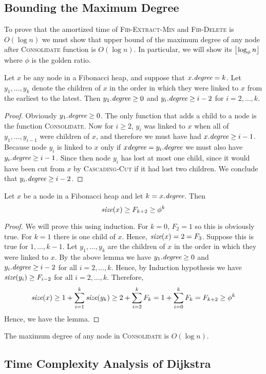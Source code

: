 \subsection{Bounding the Maximum Degree}\label{max-degree-bound}
To prove that the amortized time of \textsc{Fib-Extract-Min} and \textsc{Fib-Delete} is $O(\log n)$ we must show that upper bound of the maximum degree of any node after \textsc{Consolidate} function is $O(\log n)$. In particular, we will show its $\left\lfloor \log_{\phi}n\right\rfloor$ where $\phi$ is the golden ratio.
\begin{lemma}{}{}
Let $x$ be any node in a Fibonacci heap, and suppose that $x.\emph{degree}=k$. Let $y_1,\dots, y_k$ denote the children of $x$ in the order in which they were linked to $x$ from the earliest to the latest. Then $y_1.\emph{degree}\geq 0$ and $y_i.\emph{degree}\geq i-2$ for $i=2,\dots, k$.
\end{lemma}
\begin{proof}
	Obviously $y_1.\emph{degree}\geq 0$. The only function that adds a child to a node is the function \textsc{Consolidate}. Now for $i\geq 2$, $y_i$ was linked to $x$ when all of $y_1,\dots, y_{i-1}$ were children of $x$, and therefore we must have had $x.\emph{degree}\geq i-1$. Because node $y_i$ is linked to $x$ only if $x\emph{degree}=y_i.\emph{degree}$ we must also have $y_i.\emph{degree}\geq i-1$. Since then node $y_i$ has lost at most one child, since it would have been cut from $x$ by \textsc{Cascading-Cut} if it had lost two children. We conclude that $y_i.\emph{degree}\geq i-2$. 
\end{proof}
\begin{lemma}{}{}
Let $x$ be a node in a Fibonacci heap and let $k=x.\emph{degree}$. Then $$\emph{size}(x)\geq F_{k+2}\geq \phi^k$$
\end{lemma}
\begin{proof}
We will prove this using induction. For $k=0$, $F_2=1$ so this is obviously true. For $k=1$ there is one child of $x$. Hence, $\emph{size}(x)=2=F_3$. Suppose this is true for $1,\dots, k-1$. Let $y_1,\dots, y_k$ are the children of $x$  in the order in which they were linked to $x$. By the above lemma we have $y_1.\emph{degree}\geq 0$ and $y_i.\emph{degree}\geq i-2$ for all $i=2,\dots, k$. Hence, by Induction hypothesis we have $\emph{size}(y_i)\geq F_{i-2}$ for all $i=2,\dots, k$. Therefore, \[
	\emph{size}(x) \geq 1+\sum\limits_{i=1}^{k}\emph{size}(y_k)\geq 2+\sum\limits_{i=2}^kF_{k}=1+\sum\limits_{i=0}^k F_k=F_{k+2}\geq \phi^k
\]Hence, we have the lemma.
\end{proof}
\begin{corollary}{}{}
	The maximum degree of any node in \textsc{Consolidate}	is $O(\log n)$.
\end{corollary}
\subsection{Time Complexity Analysis of Dijkstra}
